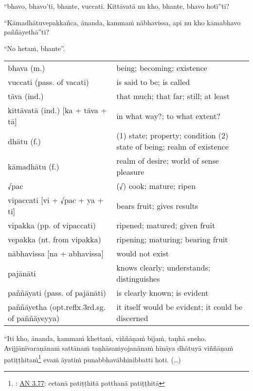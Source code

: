 \documentclass[11pt,oneside]{memoir}
\begin{document}
\begin{spacedquote}
“bhavo, bhavo'ti, bhante, vuccati. Kittāvatā nu kho, bhante, bhavo hotī”ti?

“Kāmadhātuvepakkañca, ānanda, kammaṁ nābhavissa, api nu kho kāmabhavo paññāyethā”ti?

“No hetaṁ, bhante”.
\end{spacedquote}

\begin{longtable}{L{\colOne} L{\colTwo}}
bhava (m.) & being; becoming; existence\\[0pt]
vuccati (pass. of vacati) & is said to be; is called\\[0pt]
tāva (ind.) & that much; that far; still; at least\\[0pt]
kittāvatā (ind.) [ka + tāva + tā] & in what way?; to what extent?\\[0pt]
dhātu (f.) & (1) state; property; condition (2) state of being; realm of existence\\[0pt]
kāmadhātu (f.) & realm of desire; world of sense pleasure\\[0pt]
√pac & (√) cook; mature; ripen\\[0pt]
vipaccati [vi + √pac + ya + ti] & bears fruit; gives results\\[0pt]
vipakka (pp. of vipaccati) & ripened; matured; given fruit\\[0pt]
vepakka (nt. from vipakka) & ripening; maturing; bearing fruit\\[0pt]
nābhavissa [na + abhavissa] & would not exist\\[0pt]
pajānāti & knows clearly; understands; distinguishes\\[0pt]
paññāyati (pass. of pajānāti) & is clearly known; is evident\\[0pt]
paññāyetha (opt.reflx.3rd.sg. of paññāyeyya) & it itself would be evident; it could be discerned\\[0pt]
\end{longtable}

\clearpage

\begin{spacedquote}
“Iti kho, ānanda, kammaṁ khettaṁ, viññāṇaṁ bījaṁ, taṇhā sneho. Avijjānīvaraṇānaṁ
sattānaṁ taṇhāsaṁyojanānaṁ hīnāya dhātuyā viññāṇaṁ
patiṭṭhitaṁ\footnote{: \href{https://suttacentral.net/an3.77/en/sujato}{AN 3.77}: cetanā patiṭṭhitā patthanā patiṭṭhitā} evaṁ āyatiṁ punabbhavābhinibbatti hoti. (…)
\end{spacedquote}
\end{document}
